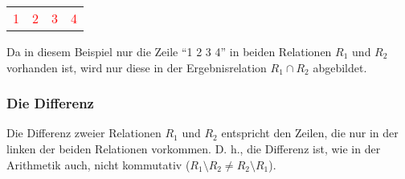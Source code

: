 \begin{center}
\begin{small}
\begin{minipage}[b]{.2\linewidth}
\begin{center}
                \end{center}
              \end{minipage}
              \hfil
              \begin{minipage}[b]{.2\linewidth}
                \begin{center}
                  \tabletail{
                    \hline
                  }
                  \tablelasttail{
                    \hline
                  }
                  \begin{supertabular}{|c|c|c|c|}
                    \textcolor{red}{1} & \textcolor{red}{2} & \textcolor{red}{3} & \textcolor{red}{4} \\
                  \end{supertabular}
                \end{center}
              \end{minipage}
            \end{small}
          \end{center}
          Da in diesem Beispiel nur die Zeile \enquote{1 2 3 4} in beiden Relationen $R_1$ und $R_2$ vorhanden ist, wird nur diese in der Ergebnisrelation $R_1\cap R_2$ abgebildet.
        \subsubsection{Die Differenz}
          Die Differenz zweier Relationen $R_1$ und $R_2$ entspricht den Zeilen, die nur in der linken der beiden Relationen vorkommen. D. h., die Differenz ist, wie in der Arithmetik auch, nicht kommutativ ($R_1 \setminus R_2 \neq R_2 \setminus R_1$).

